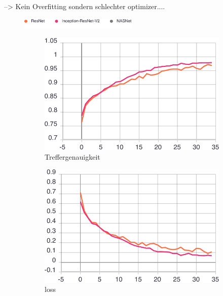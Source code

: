 --> Kein Overfitting sondern schlechter optimizer....

\begin{figure}[ht] 
  \captionsetup{width=.8\linewidth}
  \caption{Statistiken aus dem Training der Bild-basierten Klassifikation von Rechnungen mit den ResNet, Inception-ResNetV2 und NASNet Netzwerken.}
  \label{image-class-results} 
  \includegraphics[width=0.5\textwidth]{graphics/image-classification-results/legend.pdf}
  \begin{subfigure}[b]{0.5\linewidth}
    \centering
    \includegraphics[width=0.75\linewidth]{graphics/image-classification-results/acc.pdf} 
    \caption{Treffergenauigkeit} 
    \label{image-class-results:a} 
    \vspace{2ex}
  \end{subfigure}%
  \begin{subfigure}[b]{0.5\linewidth}
    \centering
    \includegraphics[width=0.75\linewidth]{graphics/image-classification-results/loss.pdf} 
    \caption{loss} 
    \label{image-class-results:b} 
    \vspace{2ex}
  \end{subfigure} 
  \begin{subfigure}[b]{0.5\linewidth}

\end{subfigure}
\end{figure}
